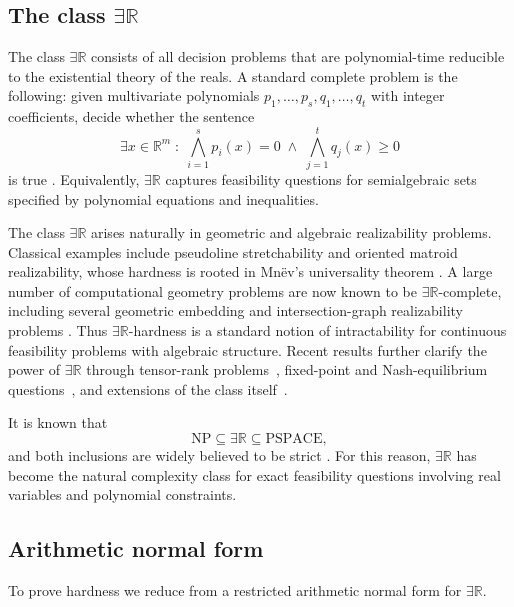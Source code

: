 \documentclass[11pt]{article}
\begin{document}
\subsection{The class \texorpdfstring{$\exists\mathbb{R}$}{ER}}

The class $\exists\mathbb{R}$ consists of all decision problems that are
polynomial-time reducible to the existential theory of the reals. A standard
complete problem is the following: given multivariate polynomials
$p_1,\dots,p_s,q_1,\dots,q_t$ with integer coefficients, decide whether the
sentence
\[
\exists x \in \mathbb{R}^m \;:\;
\bigwedge_{i=1}^{s} p_i(x)=0
\;\wedge\;
\bigwedge_{j=1}^{t} q_j(x)\ge 0
\]
is true \cite{schaefer2010complexity,cardinal2013survey}. Equivalently,
$\exists\mathbb{R}$ captures feasibility questions for semialgebraic sets
specified by polynomial equations and inequalities.

The class $\exists\mathbb{R}$ arises naturally in geometric and algebraic
realizability problems. Classical examples include pseudoline stretchability
and oriented matroid realizability, whose hardness is rooted in Mn\"ev's
universality theorem \cite{mnev1988universality,richter1996oriented}.
A large number of computational geometry problems are now known to be
$\exists\mathbb{R}$-complete, including several geometric embedding and
intersection-graph realizability problems
\cite{schaefer2010complexity,cardinal2013survey}. Thus
$\exists\mathbb{R}$-hardness is a standard notion of intractability for
continuous feasibility problems with algebraic structure. Recent results further clarify the power of $\exists\mathbb{R}$ through
tensor-rank problems~\cite{Schaefer2018Tensor}, fixed-point
and Nash-equilibrium questions~\cite{Schaefer2017Fixed}, and
extensions of the class itself~\cite{Schaefer2024Beyond}.

It is known that
\[
\mathrm{NP} \subseteq \exists\mathbb{R} \subseteq \mathrm{PSPACE},
\]
and both inclusions are widely believed to be strict
\cite{schaefer2010complexity}. For this reason, $\exists\mathbb{R}$ has become
the natural complexity class for exact feasibility questions involving real
variables and polynomial constraints.

\subsection{Arithmetic normal form}

To prove hardness we reduce from a restricted arithmetic normal form for
$\exists\mathbb{R}$.
\end{document}
